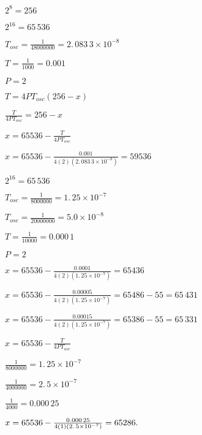 \documentclass{article}
\begin{document}
\bigskip

$2^{8}=\allowbreak 256$

$2^{16}=\allowbreak 65\,536$

$T_{osc}=\frac{1}{48000000}=\allowbreak 2.\,\allowbreak 083\,3\times 10^{-8}$

$T=\frac{1}{1000}=\allowbreak 0.001\,$

$P=2$

\bigskip

$T=4PT_{osc}\left( 256-x\right) $

$\frac{T}{4PT_{osc}}=256-x$

\bigskip

$x=65536-\frac{T}{4PT_{osc}}$

$x=65536-\frac{0.001}{4\left( 2\right) \left( 2.\,\allowbreak 083\,3\times
10^{-8}\right) }=\allowbreak 59536$

\bigskip

$2^{16}=\allowbreak 65\,536$

$T_{osc}=\frac{1}{8000000}=\allowbreak 1.\,\allowbreak 25\times 10^{-7}$

$T_{osc}=\frac{1}{20000000}=\allowbreak 5.0\times 10^{-8}$

$T=\frac{1}{10000}=\allowbreak 0.000\,1$

$P=2$

\bigskip

$x=65536-\frac{0.0001}{4\left( 2\right) \left( \allowbreak 1.\,\allowbreak
25\times 10^{-7}\right) }=\allowbreak 65436$

\bigskip

$x=65536-\frac{0.00005}{4\left( 2\right) \left( \allowbreak 1.\,\allowbreak
25\times 10^{-7}\right) }=\allowbreak 65486-55=\allowbreak 65\,431$

\bigskip

$x=65536-\frac{0.00015}{4\left( 2\right) \left( \allowbreak 1.\,\allowbreak
25\times 10^{-7}\right) }=\allowbreak 65386-55=\allowbreak 65\,331$

\bigskip

\bigskip 

$x=65536-\frac{T}{4PT_{osc}}$

\bigskip 

$\frac{1}{8000000}=\allowbreak 1.\,\allowbreak 25\times 10^{-7}$

$\frac{1}{4000000}=\allowbreak 2.\,\allowbreak 5\times 10^{-7}$

$\frac{1}{4000}=\allowbreak 0.000\,25$

$x=65536-\frac{\allowbreak 0.000\,25}{4\left( 1\right) \left( \allowbreak
\allowbreak 2.\,\allowbreak 5\times 10^{-7}\right) }=\allowbreak 65286.$
\end{document}
